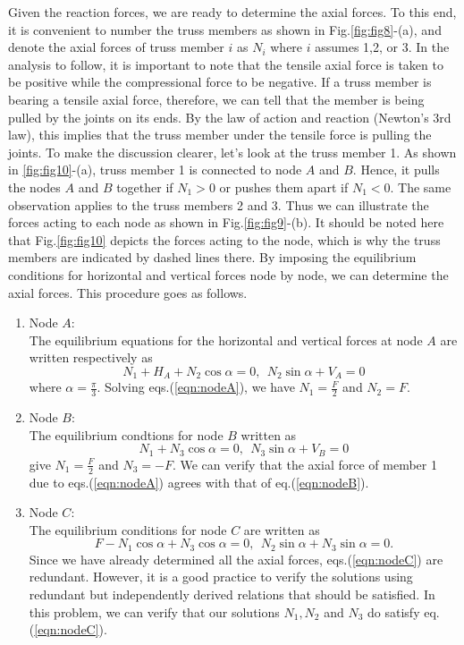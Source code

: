﻿\documentclass[10pt,a4j]{article}
\begin{document}
Given the reaction forces, we are ready to determine the axial forces. 
To this end, it is convenient to number the truss members as shown in Fig.\ref{fig:fig8}-(a), 
and denote the axial forces of truss member $i$ as $N_i$ where $i$ assumes 1,2, or 3. 
In the analysis to follow, it is important to note that the tensile axial force is taken to be positive while the compressional force to be negative. 
If a truss member is bearing a tensile axial force, therefore, we can tell that the member is being pulled by the joints on its ends. By the law of action and reaction (Newton's 3rd law), this implies that the truss member under the tensile force is pulling the joints. To make the discussion clearer, let's look at the truss member 1. As shown in \ref{fig:fig10}-(a), truss member 1 is connected to node $A$ and $B$. 
Hence, it pulls the nodes $A$ and $B$ together if $N_1>0$ or pushes them apart if $N_1<0$. 
The same observation applies to the truss members 2 and 3. 
Thus we can illustrate the forces acting to each node as shown in Fig.\ref{fig:fig9}-(b). 
It should be noted here that Fig.\ref{fig:fig10} depicts the forces acting to the node, which is why the truss members are indicated by dashed lines there. By imposing the equilibrium conditions for horizontal and vertical forces node by node, we can determine the axial forces. This procedure goes as follows.
\begin{enumerate}
\item
	Node $A$: \\
	The equilibrium equations for the horizontal and vertical forces at 
	node $A$ are written respectively as 
	\begin{equation}
		N_1+H_A+N_2\cos\alpha=0, \ \ N_2\sin\alpha+V_A=0
		\label{eqn:nodeA}
	\end{equation}
	where $\alpha=\frac{\pi}{3}$. Solving eqs.(\ref{eqn:nodeA}), 
	we have $N_1=\frac{F}{2}$ and $N_2=F$. 
\item
	Node $B$: \\
	The equilibrium condtions for node $B$ written as 
	\begin{equation}
		N_1+N_3\cos\alpha=0, \ \ N_3\sin\alpha+V_B=0
		\label{eqn:nodeB}
	\end{equation}
	give $N_1=\frac{F}{2}$ and $N_3=-F$. We can verify that the axial 
	force of member 1 due to eqs.(\ref{eqn:nodeA}) agrees with that of eq.(\ref{eqn:nodeB}).
\item
	Node $C$: \\
	The equilibrium conditions for node $C$ are written as 
	\begin{equation}
		F-N_1\cos\alpha+N_3\cos\alpha=0, \ \ N_2\sin\alpha+N_3\sin\alpha=0.
		\label{eqn:nodeC}
	\end{equation}
	Since we have already determined all the axial forces, eqs.(\ref{eqn:nodeC}) are redundant.  
	However, it is a good practice to verify the solutions using redundant 
	but independently derived relations that should be satisfied.  
	In this problem, we can verify that our solutions $N_1,N_2$ and $N_3$ do 
	satisfy eq.(\ref{eqn:nodeC}).
\end{enumerate}
\end{document}
